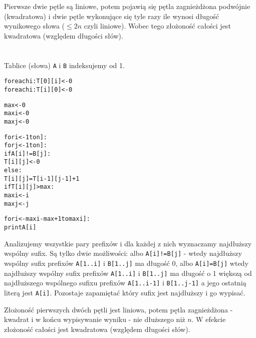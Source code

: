 \documentclass[a4paper,12pt]{article}
\begin{document}
Pierwsze dwie pętle są liniowe, potem pojawią się pętla zagnieżdżona podwójnie (kwadratowa) i dwie pętle wykonujące się tyle razy ile wynosi długość wynikowego słowa ($\leq2n$ czyli liniowe). Wobec tego złożoność całości jest kwadratowa (względem długości słów).

\section{}
Tablice (słowa) \verb|A| i \verb|B| indeksujemy od 1.
\begin{alltt}
for each i: T[0][i] <- 0
for each i: T[i][0] <- 0

max <- 0
maxi <- 0
maxj <- 0

for i <- 1 to n]:
    for j <- 1 to n]:
        if A[i]!=B[j]:
            T[i][j] <- 0
        else:
            T[i][j]=T[i-1][j-1]+1
            if T[i][j]>max:
                maxi <- i
                maxj <- j

for i <- maxi-max+1 to maxi]:
    print A[i]
\end{alltt}
Analizujemy wszystkie pary prefixów i dla każdej z nich wyznaczamy najdłuższy wspólny sufix. Są tylko dwie możliwości: albo \verb|A[i]!=B[j]| - wtedy najdłuższy wspólny sufix prefixów \verb|A[1..i]| i \verb|B[1..j]| ma długość 0, albo \verb|A[i]=B[j]| wtedy najdłuższy wspólny sufix prefixów \verb|A[1..i]| i \verb|B[1..j]| ma długość o 1 większą od najdłuższego wspólnego sufixu prefixów \verb|A[1..i-1]| i \verb|B[1..j-1]| a jego ostatnią literą jest \verb|A[i]|. Pozostaje zapamiętać który sufix jest najdłuższy i go wypisać.

Złożoność pierwszych dwóch pętli jest liniowa, potem pętla zagnieżdżona - kwadrat i w końcu wypisywanie wyniku - nie dłuższego niż $n$. W efekcie złożoność całości jest kwadratowa (względem długości słów).
\end{document}
